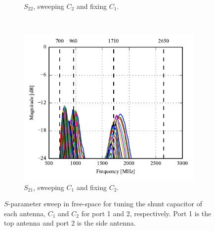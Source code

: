 \begin{figure}[htbp]
\begin{subfigure}[b]{0.49\linewidth}
        \caption{$S_{22}$, sweeping $C_2$ and fixing $C_1$.}
    \end{subfigure}
~
\center
    \begin{subfigure}[b]{0.49\linewidth}
        \centering
        \includegraphics{img/tech_sol/monopole/5mm/meas/S21.pdf}
        \caption{$S_{21}$, sweeping $C_1$ and fixing $C_2$.}
    \end{subfigure}
    \caption{$S$-parameter sweep in free-space for tuning the shunt capacitor of each antenna, $C_1$ and $C_2$ for port 1 and 2, respectively. Port 1 is the top antenna and port 2 is the side antenna.}
    \label{fig:sparam_mono_mini_meas}
\end{figure}

